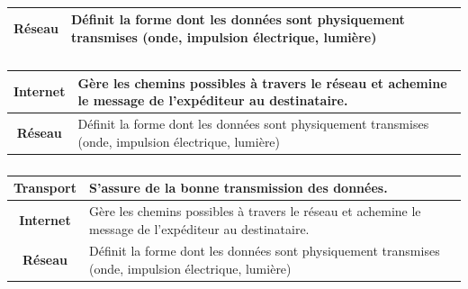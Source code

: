 \documentclass[svgnames,11pt]{beamer}
\begin{document}
\begin{frame}
    \frametitle{}

    \begin{center}
        \renewcommand{\arraystretch}{1.5}
        \begin{tabular}{|c|p{}|}
            \hline
            \textbf{Réseau} & Définit la forme dont les données sont physiquement transmises (onde, impulsion électrique, lumière) \\
            \hline
        \end{tabular}
        \renewcommand{\arraystretch}{1}
    \end{center}
\end{frame}
\begin{frame}
    \frametitle{}

    \begin{center}
        \renewcommand{\arraystretch}{1.5}
        \begin{tabular}{|c|p{}|}
            \hline
            \textbf{Internet} & Gère les chemins possibles à travers le réseau et achemine le message de l'expéditeur au destinataire. \\
            \hline
            \textbf{Réseau}   & Définit la forme dont les données sont physiquement transmises (onde, impulsion électrique, lumière)   \\
            \hline
        \end{tabular}
        \renewcommand{\arraystretch}{1}
    \end{center}
\end{frame}
\begin{frame}
    \frametitle{}

    \begin{center}
        \renewcommand{\arraystretch}{1.5}
        \begin{tabular}{|c|p{}|}
            \hline
            \textbf{Transport} & S'assure de la bonne transmission des données.                                                         \\
            \hline
            \textbf{Internet}  & Gère les chemins possibles à travers le réseau et achemine le message de l'expéditeur au destinataire. \\
            \hline
            \textbf{Réseau}    & Définit la forme dont les données sont physiquement transmises (onde, impulsion électrique, lumière)   \\
            \hline
        \end{tabular}
        \renewcommand{\arraystretch}{1}
    \end{center}
\end{frame}
\end{document}
